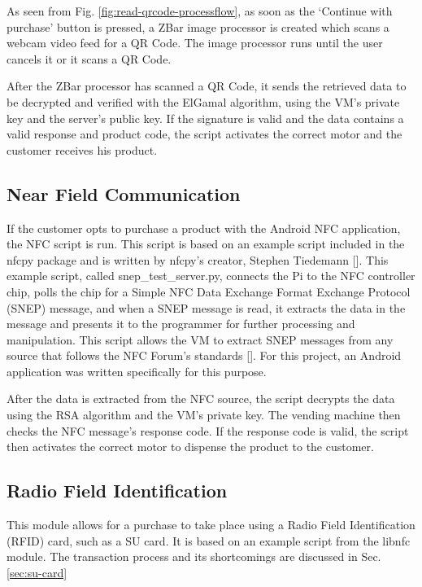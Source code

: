 As seen from Fig. \ref{fig:read-qrcode-processflow}, as soon as the `Continue
with purchase' button is pressed, a ZBar image processor is created
which scans a webcam video feed for a QR Code. The image processor runs until the user
cancels it or it scans a QR Code. 

After the ZBar processor has scanned a QR Code, it sends the retrieved data to
be decrypted and verified with the ElGamal algorithm, using the VM's
private key and the server's public key. If the signature is valid and the data
contains a valid response and product code, the script activates the correct
motor and the customer receives his product. 

\subsection{Near Field Communication}

If the customer opts to purchase a product with the Android NFC application, the NFC
script is run. This script is based on an example script included in the nfcpy package and is written by nfcpy's creator, Stephen
Tiedemann [\cite{website:nfcpy}]. This example script, called snep\_test\_server.py,
connects the Pi to the NFC controller chip, polls the chip for a Simple NFC Data Exchange Format
Exchange Protocol (SNEP) message, and when a SNEP message is read, it extracts the data
in the message and presents it to the programmer for further processing and manipulation.
This script allows the VM to extract SNEP messages from any source that
follows the NFC Forum's standards [\cite{website:nfc-forum}]. For this project, an
Android application was written specifically for this purpose.

After the data is extracted from the NFC source, the script decrypts the data
using the RSA algorithm and the VM's private key. The vending
machine then checks the NFC message's response code. If the response code is valid, the
script then activates the correct motor to dispense the product to the customer.

\subsection{Radio Field Identification}

This module allows for a purchase to take place using a Radio Field
Identification (RFID) card, such as a SU card. It is based on an example script
from the libnfc module. The transaction process and its shortcomings are
discussed in Sec. \ref{sec:su-card}

